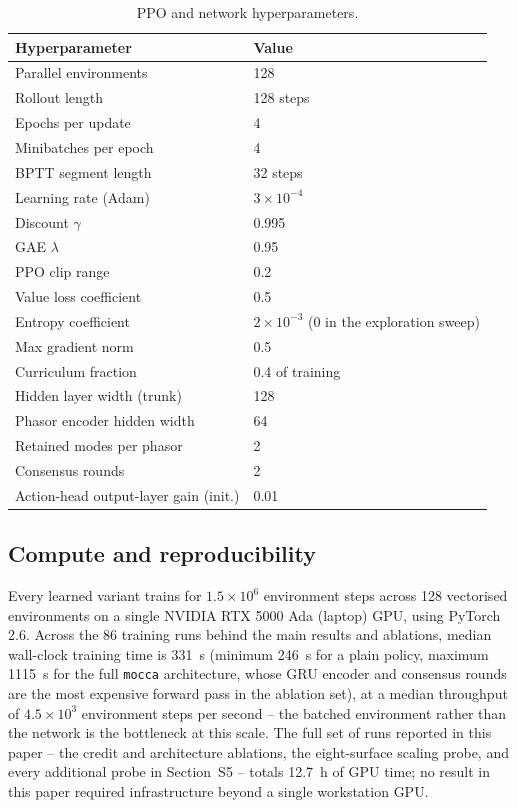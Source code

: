 \documentclass[11pt]{article}
\begin{document}
\begin{table}[h]
\centering
\caption{PPO and network hyperparameters.}
\label{tab:params-ppo}
\begin{tabular}{@{}lp{5.6cm}@{}}
\toprule
Hyperparameter & Value \\
\midrule
Parallel environments & 128 \\
Rollout length & 128 steps \\
Epochs per update & 4 \\
Minibatches per epoch & 4 \\
BPTT segment length & 32 steps \\
Learning rate (Adam) & $3\times 10^{-4}$ \\
Discount $\gamma$ & 0.995 \\
GAE $\lambda$ & 0.95 \\
PPO clip range & 0.2 \\
Value loss coefficient & 0.5 \\
Entropy coefficient & $2\times 10^{-3}$ (0 in the exploration sweep) \\
Max gradient norm & 0.5 \\
Curriculum fraction & 0.4 of training \\
Hidden layer width (trunk) & 128 \\
Phasor encoder hidden width & 64 \\
Retained modes per phasor & 2 \\
Consensus rounds & 2 \\
Action-head output-layer gain (init.) & 0.01 \\
\bottomrule
\end{tabular}
\end{table}

\subsection*{Compute and reproducibility}

Every learned variant trains for $1.5{\times}10^6$ environment steps
across 128 vectorised environments on a single NVIDIA RTX 5000 Ada
(laptop) GPU, using PyTorch 2.6. Across the 86 training runs behind the
main results and ablations, median wall-clock training time is
\SI{331}{\second} (minimum \SI{246}{\second} for a plain policy, maximum
\SI{1115}{\second} for the full \texttt{mocca} architecture, whose GRU
encoder and consensus rounds are the most expensive forward pass in the
ablation set), at a median throughput of $4.5{\times}10^3$ environment
steps per second -- the batched environment rather than the network is the
bottleneck at this scale. The full set of runs reported in this paper --
the credit and architecture ablations, the eight-surface scaling probe,
and every additional probe in Section~S5 -- totals \SI{12.7}{\hour} of GPU
time; no result in this paper required infrastructure beyond a single
workstation GPU.
\end{document}
